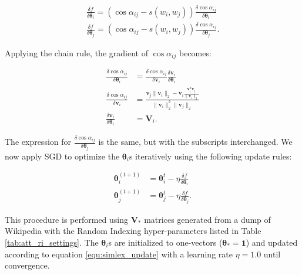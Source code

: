 \documentclass[11pt]{article}
\begin{document}
\begin{gather}
    \frac{\delta f}{\delta \boldsymbol\theta_i} = \left(\cos{\alpha_{ij}} - s(w_i,w_j)\right) \frac{\delta \cos{\alpha_{ij}}}{\delta \boldsymbol\theta_i} \\
    \frac{\delta f}{\delta \boldsymbol\theta_j} = \left(\cos{\alpha_{ij}} - s(w_i,w_j)\right) \frac{\delta \cos{\alpha_{ij}}}{\delta \boldsymbol\theta_j}.
\end{gather}

Applying the chain rule, the gradient of $\cos{\alpha_{ij}}$ becomes:

\begin{equation}
\begin{split}
    \frac{\delta \cos{\alpha_{ij}}}{\delta \boldsymbol\theta_i} & = \frac{\delta \cos{\alpha_{ij}}}{\delta \textbf{v}_i}\frac{\delta \textbf{v}_i}{\delta \boldsymbol\theta_i} \\
    \frac{\delta \cos{\alpha_{ij}}}{\delta \textbf{v}_i} & = \frac
        {\textbf{v}_j\|\textbf{v}_i\|_2 - \textbf{v}_i\frac{\textbf{v}_i^T\textbf{v}_j}{\|\textbf{v}_i\|_2}}
        {\|\textbf{v}_i\|_2^2\|\textbf{v}_j\|_2} \\
    \frac{\delta \textbf{v}_i}{\delta \boldsymbol\theta_i} & = \textbf{V}_i.
\end{split}
\end{equation}

The expression for $\frac{\delta \cos{\alpha_{ij}}}{\delta \boldsymbol\theta_j}$ is the same, but with the subscripts interchanged. We now apply SGD to optimize the $\boldsymbol{\theta}_i$s iteratively using the following update rules:

\begin{equation} \label{equ:simlex_update}
\begin{split}
    \boldsymbol\theta_i^{(t+1)} &  = \boldsymbol\theta_i^t - \eta \frac{\delta f}{\delta \boldsymbol\theta_i}  \\
    \boldsymbol\theta_j^{(t+1)} &  = \boldsymbol\theta_j^t - \eta \frac{\delta f}{\delta \boldsymbol\theta_j}.
\end{split}
\end{equation}
 
This procedure is performed using $\textbf{V}_*$ matrices generated from a dump of Wikipedia with the Random Indexing hyper-parameters listed in Table \ref{tab:att_ri_settings}. The $\boldsymbol{\theta}_i$s are initialized to one-vectors ($\boldsymbol\theta_* = \textbf{1}$) and updated according to equation \eqref{equ:simlex_update} with a learning rate $\eta = 1.0$ until convergence.
\end{document}
